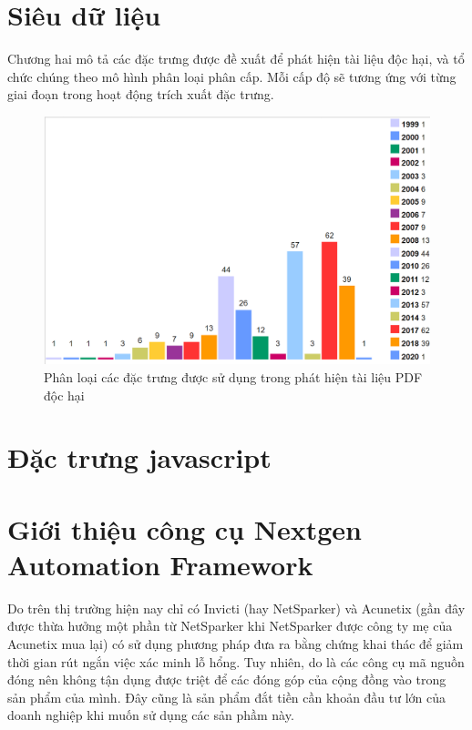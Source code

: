 \documentclass[./../main.tex]{subfiles}
\begin{document}
\section{Siêu dữ liệu}
Chương hai mô tả các đặc trưng được đề xuất để phát hiện tài liệu độc hại, và tổ chức chúng theo mô hình phân loại phân cấp. Mỗi cấp độ sẽ tương ứng với từng giai đoạn trong hoạt động trích xuất đặc trưng.
\begin{figure}[ht!]
	\includegraphics[width=\linewidth]{./images/img2_acrobatcve.png}
	\caption{Phân loại các đặc trưng được sử dụng trong phát hiện tài liệu PDF độc hại}
	\label{fig:taxonomy}
\end{figure}
\section{Đặc trưng javascript}



\section{Giới thiệu công cụ Nextgen Automation Framework}






Do trên thị trường hiện nay chỉ có Invicti (hay NetSparker) và Acunetix (gần đây được thừa hưởng một phần từ NetSparker khi NetSparker được công ty mẹ của Acunetix mua lại) có sử dụng phương pháp đưa ra bằng chứng khai thác để giảm thời gian rút ngắn việc xác minh lỗ hổng. Tuy nhiên, do là các công cụ mã nguồn đóng nên không tận dụng được triệt để các đóng góp của cộng đồng vào trong sản phẩm của mình. Đây cũng là sản phẩm đắt tiền cần khoản đầu tư lớn của doanh nghiệp khi muốn sử dụng các sản phầm này.
\end{document}
